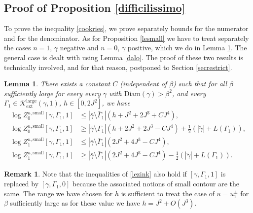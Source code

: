 \documentclass[10pt]{amsart}
\let\mathcal\mathscr
\numberwithin{equation}{section}
\theoremstyle{plain}
\newtheorem{lemma}[theorem]{Lemma}
\theoremstyle{definition}
\newtheorem{rem}[theorem]{Remark}
\newcommand{\ext}{\mathrm{ext}}
\newcommand{\sm}{\mathrm{small}}
\newcommand{\Diam}{\mathrm{Diam}}
\newcommand{\larg}{\mathrm{large}}
\newcommand{\cK}{{\ensuremath{\mathcal K}} }
\newcommand{\gb}{\beta}
\newcommand{\gG}{\Gamma}
\begin{document}
\subsection{Proof of Proposition \ref{difficilissimo}}\label{dcimo}

To prove the inequality \eqref{cookries}, we prove separately bounds for the numerator and for the denominator.
As for Proposition \ref{lesmall}
we have to treat separately the cases $n=1$, $\gamma$ negative and $n=0$, $\gamma$ positive, which we do in Lemma \ref{dzip}. The general case is dealt with using Lemma
\ref{dalo}.
The proof of these two results is technically involved, and for that reason, postponed to Section \ref{secrestrict}.

\begin{lemma}\label{dzip}
There exists a constant $C$ (independent of $\gb$) such that for all $\gb$ sufficiently large for every every $\gamma$ with $\Diam(\gamma)> \gb^2$, and every
$\gG_1\in \cK^{\larg}_{\ext}(\gamma,1)$,
$h\in \left[0,2J^2\right]$, we have
\begin{equation}\label{lezink}
\begin{split}
\log Z^{u,\sm}_{0}[\gamma,\Gamma_1,1]&\le|\bar \gamma \setminus \bar \Gamma_1|\left(h+J^2+2J^3+C J^4\right),\\
\log Z^{u,\sm}_{0}[\gamma,\Gamma_1,1]&\ge |\bar \gamma \setminus \bar \Gamma_1|\left(h+2J^2+2J^3-CJ^4\right)+\frac{1}{2}(|\tilde \gamma|+L(\gG_1)),\\
\log Z^{u,\sm}_{1}[\gamma,\Gamma_1,1]&\le|\bar \gamma \setminus \bar \Gamma_1|\left(2J^2+4J^3-C J^4\right),\\
\log Z^{u,\sm}_{1} [\gamma,\Gamma_1,1]&\ge |\bar \gamma \setminus \bar \Gamma_1| \left(2J^2+4J^3-CJ^4\right) -\frac{1}{2}(|\tilde \gamma|+L(\gG_1)).
\end{split}
\end{equation}
\end{lemma}

\begin{rem}
Note that the inequalities of \eqref{lezink} also hold if $[\gamma,\Gamma_1,1]$ is replaced by $[\gamma,\Gamma_1,0]$ because the associated notions of small contour are the same.
The range we have chosen for $h$ is sufficient to treat the case of $u=u^{\pm}_1$ for $\gb$ sufficiently large as for these value we have $h=J^2+O(J^3)$.
\end{rem}
\end{document}

